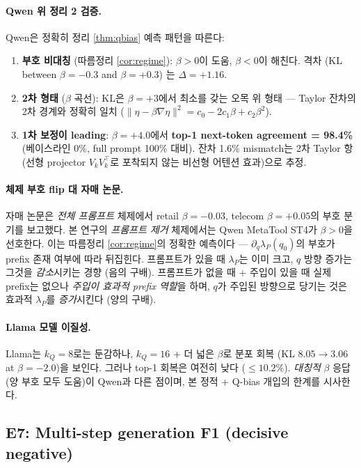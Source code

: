 \documentclass{article}
\theoremstyle{definition}
\begin{document}
\paragraph{Qwen 위 정리 2 검증.}
Qwen은 정확히 정리 \ref{thm:qbias} 예측 패턴을 따른다:
\begin{enumerate}[leftmargin=*, itemsep=2pt]
\item \textbf{부호 비대칭} (따름정리 \ref{cor:regime}): $\beta>0$이 도움, $\beta<0$이 해친다. 격차 (KL between $\beta{=}{-}0.3$ and $\beta{=}{+}0.3$) 는 $\Delta = +1.16$.
\item \textbf{2차 형태} ($\beta$ 곡선): KL은 $\beta{=}{+}3$에서 최소를 갖는 오목 위 형태 --- Taylor 잔차의 2차 경계와 정확히 일치 ($\|η - β\nabla\eta\|^2 = c_0 - 2c_1\beta + c_2\beta^2$).
\item \textbf{1차 보정이 leading}: $\beta{=}{+}4.0$에서 \textbf{top-1 next-token agreement = 98.4\%} (베이스라인 0\%, full prompt 100\% 대비). 잔차 1.6\% mismatch는 2차 Taylor 항 (선형 projector $V_k V_k^\top$로 포착되지 않는 비선형 어텐션 효과)으로 추정.
\end{enumerate}

\paragraph{체제 부호 flip 대 자매 논문.}
자매 논문은 \emph{전체 프롬프트} 체제에서 retail $\beta{=}{-}0.03$, telecom $\beta{=}{+}0.05$의 부호 분기를 보고했다. 본 연구의 \emph{프롬프트 제거} 체제에서는 Qwen MetaTool ST4가 $\beta>0$을 선호한다. 이는 따름정리 \ref{cor:regime}의 정확한 예측이다 --- $\partial_q \lambda_P(q_0)$의 부호가 prefix 존재 여부에 따라 뒤집힌다. 프롬프트가 있을 때 $\lambda_P$는 이미 크고, $q$ 방향 증가는 그것을 \emph{감소}시키는 경향 (음의 구배). 프롬프트가 없을 때 + 주입이 있을 때 실제 prefix는 없으나 \emph{주입이 효과적 prefix 역할}을 하며, $q$가 주입된 방향으로 당기는 것은 효과적 $\lambda_P$를 \emph{증가}시킨다 (양의 구배).

\paragraph{Llama 모델 이질성.}
Llama는 $k_Q{=}8$로는 둔감하나, $k_Q{=}16$ + 더 넓은 $\beta$로 분포 회복 (KL $8.05 \to 3.06$ at $\beta{=}{-}2.0$)을 보인다. 그러나 top-1 회복은 여전히 낮다 ($\le 10.2\%$). \emph{대칭적} $\beta$ 응답 (양 부호 모두 도움)이 Qwen과 다른 점이며, 본 정적 + Q-bias 개입의 한계를 시사한다.

\subsection{E7: Multi-step generation F1 (decisive negative)}
\label{sec:results-multistep}
\end{document}

